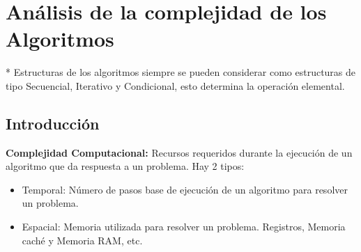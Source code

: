 \chapter{Análisis de la complejidad de los Algoritmos}\label{ch:análisis-de-la-complejidad-de-los-algoritmos}

* Estructuras de los algoritmos siempre se pueden considerar como estructuras de tipo Secuencial, Iterativo y Condicional, esto determina la operación elemental.

\section{Introducción}\label{sec:introduccion}
\textbf{Complejidad Computacional:} Recursos requeridos durante la ejecución de un algoritmo que da respuesta a un problema. Hay 2 tipos:
\begin{itemize}
  \item Temporal: Número de pasos base de ejecución de un algoritmo para resolver un problema.
  \item Espacial: Memoria utilizada para resolver un problema. Registros, Memoria caché y Memoria RAM, etc.
\end{itemize}

